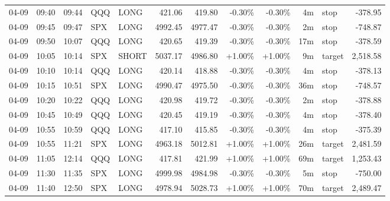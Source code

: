 \documentclass[11pt,a4paper]{article}
\begin{document}
\begin{center}
\begin{longtable}{>{\color{txtmain}}l l l l l r r r r r >{\color{txtmain}}l r}
04-09 & 09:40 & 09:44 & QQQ & LONG & 421.06 & 419.80 & \textcolor{lossred}{-0.30\%} & \textcolor{lossred}{-0.30\%} & 4m & stop & \textcolor{lossred}{-378.95} \\
04-09 & 09:45 & 09:47 & SPX & LONG & 4992.45 & 4977.47 & \textcolor{lossred}{-0.30\%} & \textcolor{lossred}{-0.30\%} & 2m & stop & \textcolor{lossred}{-748.87} \\
04-09 & 09:50 & 10:07 & QQQ & LONG & 420.65 & 419.39 & \textcolor{lossred}{-0.30\%} & \textcolor{lossred}{-0.30\%} & 17m & stop & \textcolor{lossred}{-378.59} \\
04-09 & 10:05 & 10:14 & SPX & SHORT & 5037.17 & 4986.80 & \textcolor{wingreen}{+1.00\%} & \textcolor{wingreen}{+1.00\%} & 9m & target & \textcolor{wingreen}{2,518.58} \\
04-09 & 10:10 & 10:14 & QQQ & LONG & 420.14 & 418.88 & \textcolor{lossred}{-0.30\%} & \textcolor{lossred}{-0.30\%} & 4m & stop & \textcolor{lossred}{-378.13} \\
04-09 & 10:15 & 10:51 & SPX & LONG & 4990.47 & 4975.50 & \textcolor{lossred}{-0.30\%} & \textcolor{lossred}{-0.30\%} & 36m & stop & \textcolor{lossred}{-748.57} \\
04-09 & 10:20 & 10:22 & QQQ & LONG & 420.98 & 419.72 & \textcolor{lossred}{-0.30\%} & \textcolor{lossred}{-0.30\%} & 2m & stop & \textcolor{lossred}{-378.88} \\
04-09 & 10:45 & 10:49 & QQQ & LONG & 420.45 & 419.19 & \textcolor{lossred}{-0.30\%} & \textcolor{lossred}{-0.30\%} & 4m & stop & \textcolor{lossred}{-378.40} \\
04-09 & 10:55 & 10:59 & QQQ & LONG & 417.10 & 415.85 & \textcolor{lossred}{-0.30\%} & \textcolor{lossred}{-0.30\%} & 4m & stop & \textcolor{lossred}{-375.39} \\
04-09 & 10:55 & 11:21 & SPX & LONG & 4963.18 & 5012.81 & \textcolor{wingreen}{+1.00\%} & \textcolor{wingreen}{+1.00\%} & 26m & target & \textcolor{wingreen}{2,481.59} \\
04-09 & 11:05 & 12:14 & QQQ & LONG & 417.81 & 421.99 & \textcolor{wingreen}{+1.00\%} & \textcolor{wingreen}{+1.00\%} & 69m & target & \textcolor{wingreen}{1,253.43} \\
04-09 & 11:30 & 11:35 & SPX & LONG & 4999.98 & 4984.98 & \textcolor{lossred}{-0.30\%} & \textcolor{lossred}{-0.30\%} & 5m & stop & \textcolor{lossred}{-750.00} \\
04-09 & 11:40 & 12:50 & SPX & LONG & 4978.94 & 5028.73 & \textcolor{wingreen}{+1.00\%} & \textcolor{wingreen}{+1.00\%} & 70m & target & \textcolor{wingreen}{2,489.47} \\

\end{longtable}
\end{center}
\end{document}
